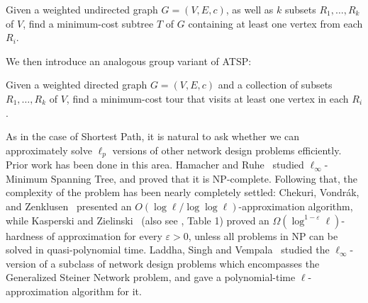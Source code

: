 \documentclass[11pt,a4paper]{article}
\begin{document}
\begin{problem} Given a weighted undirected graph $G = (V,E,c)$, as well as $k$ subsets $R_1, \dots, R_k$ of $V$, find a minimum-cost subtree $T$ of $G$ containing at least one vertex from each $R_i$.
\end{problem}

We then introduce an analogous group variant of ATSP:

\begin{problem} Given a weighted directed graph $G=(V,E,c)$ and a collection of subsets $R_1, \dots, R_k$ of \(V\), find a minimum-cost tour that visits at least one vertex in each $R_i$. 
\end{problem}

As in the case of Shortest Path, it is natural to ask whether we can approximately solve $\ell_p$ versions of other network design problems efficiently. Prior work has been done in this area. Hamacher and Ruhe~\cite{hamacher1994spanning} studied $\ell_\infty$-Minimum Spanning Tree, and proved that it is NP-complete. Following that, the complexity of the problem has been nearly completely settled: Chekuri, Vondrák, and Zenklusen~\cite{chekuri2010dependent} presented an $O(\log \ell/ \log\log \ell)$-approximation algorithm, while Kasperski and Zielinski~\cite{kasperski2011approximability} (also see \cite{kasperski2016robust}, Table 1) proved an $\Omega(\log^{1-\varepsilon} \ell)$-hardness of approximation for every $\varepsilon >0$, unless all problems in NP can be solved in quasi-polynomial time. Laddha, Singh and Vempala~\cite{laddha2022socially} studied the $\ell_\infty$-version of a subclass of network design problems which encompasses the Generalized Steiner Network problem, and gave a polynomial-time $\ell$-approximation algorithm for it.



\end{document}
